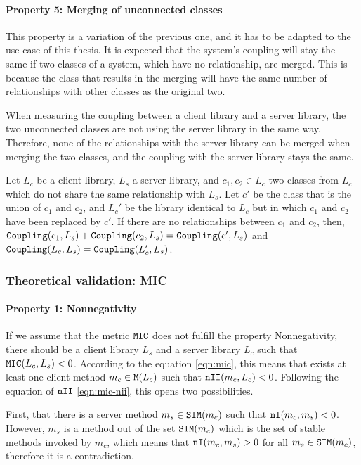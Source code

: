 \paragraph{Property 5: Merging of unconnected classes}
This property is a variation of the previous one, and it has to be adapted to the use case of this thesis. It is expected that the system's coupling will stay the same if two classes of a system, which have no relationship, are merged. This is because the class that results in the merging will have the same number of relationships with other classes as the original two.

When measuring the coupling between a client library and a server library, the two unconnected classes are not using the server library in the same way. Therefore, none of the relationships with the server library can be merged when merging the two classes, and the coupling with the server library stays the same.

Let $L_c$ be a client library, $L_s$ a server library, and $c_1, c_2 \in L_c$ two classes from $L_c$ which do not share the same relationship with $L_s$. Let $c'$ be the class that is the union of  $c_1$ and $c_2$, and $L_c'$ be the library identical to $L_c$ but in which $c_1$ and $c_2$ have been replaced by $c'$. If there are no relationships between $c_1$ and $c_2$, then, $\verb|Coupling|(c_1, L_s) + \verb|Coupling|(c_2, L_s) = \verb|Coupling|(c', L_s)$ and $\verb|Coupling|(L_c, L_s) = \verb|Coupling|(L_c', L_s)$.

\subsubsection{Theoretical validation: MIC}

\paragraph{Property 1: Nonnegativity}
If we assume that the metric $\verb|MIC|$ does not fulfill the property Nonnegativity, there should be a client library $L_s$ and a server library $L_c$ such that $\verb|MIC|(L_c, L_s) < 0$.
According to the equation \ref{eqn:mic}, this means that exists at least one client method $m_c \in \verb|M|(L_c)$ such that $\verb|nII|(m_c, L_c) < 0$. Following the equation of $\verb|nII|$ \ref{eqn:mic-nii}, this opens two possibilities.

First, that there is a server method $m_s \in \verb|SIM|(m_c)$ such that $\verb|nI|(m_c, m_s) < 0$. However, $m_s$ is a method out of the set $\verb|SIM|(m_c)$ which is the set of stable methods invoked by $m_c$, which means that $\verb|nI|(m_c, m_s) > 0$ for all $m_s \in \verb|SIM|(m_c)$, therefore it is a contradiction.

